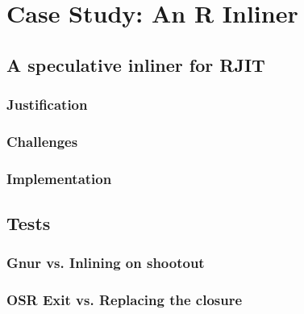 
\chapter{Case Study: An R Inliner} %

\label{Chapter5} %


\newcommand{\keyword}[1]{\textbf{#1}}
\newcommand{\tabhead}[1]{\textbf{#1}}
\newcommand{\code}[1]{\texttt{#1}}
\newcommand{\file}[1]{\texttt{\bfseries#1}}
\newcommand{\option}[1]{\texttt{\itshape#1}}


\section{A speculative inliner for RJIT}
\subsection{Justification}
\subsection{Challenges}
\subsection{Implementation}
\section{Tests}
\subsection{Gnur vs. Inlining on shootout}
\subsection{OSR Exit vs. Replacing the closure}


